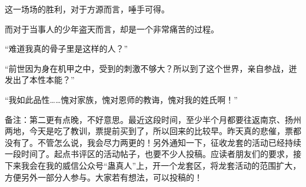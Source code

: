 \begin{this_body}
这一场场的胜利，对于方源而言，唾手可得。

而对于当事人的少年盗天而言，却是一个非常痛苦的过程。

“难道我真的骨子里是这样的人？”

“前世因为身在机甲之中，受到的刺激不够大？所以到了这个世界，亲自参战，迸发出了本性本能？”

“我如此品性……愧对家族，愧对恩师的教诲，愧对我的姓氏啊！”

备注：第二更有点晚，不好意思。最近这段时间，至少半个月都要往返南京、扬州两地，今天是吃了教训，票提前买到了，所以回来的比较早。昨天真的悲催，票都没有了。不管怎么说，我会尽力两更的！另外通知一下，征收龙套的活动已经持续一段时间了。起点书评区的活动帖子，也要不少人投稿。应读者朋友们的要求，接下来我会在我的威信公众号“蛊真人”上，开一个龙套区，将龙套活动的范围扩大，方便另外一部分人参与。大家若有想法，可以投稿的！

\end{this_body}

